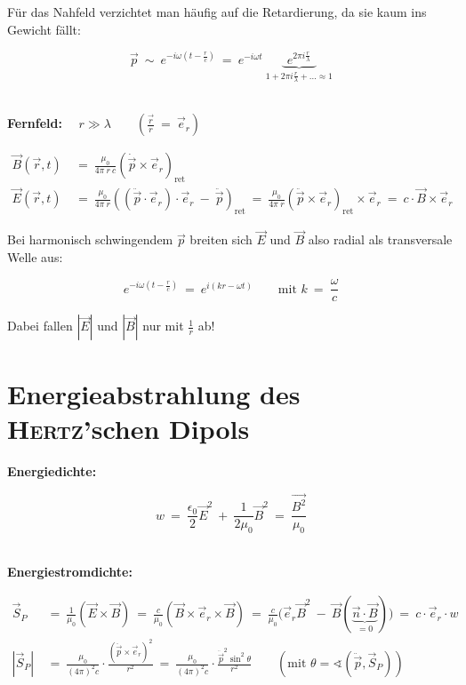 \begin{enumerate}[label=\roman*)]
	Für das Nahfeld verzichtet man häufig auf die Retardierung, da sie kaum ins Gewicht fällt:
	
	\begin{equation*}
	\vec{p} \ \sim \ e^{-i\omega\left(t-\frac{r}{c}\right)}  \ = \ e^{-i\omega t} \ \underbrace{\; e^{2\pi i \frac{r}{\lambda}}\;}_{1+2\pi i \frac{r}{\lambda}+\ldots \approx 1}
	\end{equation*}
	
	\ \\
	\textbf{Fernfeld:} $\quad r \gg \lambda \qquad\left(\frac{\vec{r}}{r} \ = \ \vec{e}_r\right)$
	
	\begin{align*}	
	\vec{B}(\vec{r},t)  \ &= \ \frac{\mu_0}{4\pi \ r \ c} \left(\dot{\vec{p}}\times\vec{e}_r\right)_{\text{ret}}\\
	\vec{E}(\vec{r},t)  \ &= \ \frac{\mu_0}{4\pi \ r} \left(\left(\ddot{\vec{p}}\cdot\vec{e}_r\right)\cdot\vec{e}_r \ - \ \ddot{\vec{p}}\right)_{\text{ret}}  \ = \ \frac{\mu_0}{4\pi \ r}\left(\ddot{\vec{p}}\times\vec{e}_r\right)_{\text{ret}}\times\vec{e}_r  \ = \ c\cdot\vec{B}\times\vec{e}_r
	\end{align*}
	
	Bei harmonisch schwingendem $\vec{p}$ breiten sich $\vec{E}$ und $\vec{B}$ also radial als transversale Welle aus:
	
	\begin{equation*}
	e^{-i\omega\left(t-\frac{r}{c}\right)}  \ = \ e^{i(kr-\omega t)} \qquad \text{mit } k  \ = \  \frac{\omega}{c}
	\end{equation*}
	
	Dabei fallen $|\vec{E}|$ und $|\vec{B}|$ nur mit $\frac{1}{r}$ ab!
\end{enumerate}


\section{Energieabstrahlung des \textsc{Hertz}'schen Dipols}

\textbf{Energiedichte:}

\begin{equation*}
w  \ = \ \frac{\epsilon_0}{2} \vec{E}^2  \ +  \ \frac{1}{2\mu_0} \vec{B}^2  \ = \ \frac{\vec{B^2}}{\mu_0}
\end{equation*}

\ \\
\textbf{Energiestromdichte:}

\begin{align*}
\vec{S}_P  \ &= \ \frac{1}{\mu_0} (\vec{E}\times\vec{B})  \ = \ \frac{c}{\mu_0} (\vec{B}\times\vec{e}_r\times\vec{B})  \ = \  \frac{c}{\mu_0}\Big(\vec{e}_r\vec{B}^2 \ - \ \vec{B}(\underbrace{\vec{n}\cdot\vec{B}}_{=0})\Big)  \ = \ c\cdot\vec{e}_r\cdot w\\
|\vec{S}_P|  \ &= \ \frac{\mu_0}{(4\pi)^2c}\cdot \frac{\left(\ddot{\vec{p}}\times\vec{e}_r\right)^2}{r^2} \ = \ \frac{\mu_0}{(4\pi)^2c}\cdot\frac{\ddot{\vec{p}}^2\sin^2\theta}{r^2} \qquad \left(\text{mit } \theta = \sphericalangle(\ddot{\vec{p}},\vec{S}_P)\right)
\end{align*}

